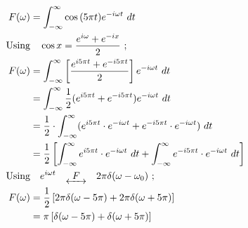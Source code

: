 \documentclass[preview]{standalone}
\begin{document}
\begin{align*}
F(\omega)&=\int_{-\infty}^{\infty} \cos{(5\pi t)} e^{-i\omega t} \ dt \\ \textrm{Using}& \quad \cos{x}=\frac{e^{i\omega}+e^{-ix}}{2} \ ; \\ F(\omega)&=\int_{-\infty}^{\infty}\left[ \frac{e^{i5\pi t}+e^{-i5\pi t}}{2}\right] e^{-i\omega t} \ dt \\ &=\int_{-\infty}^{\infty} \frac{1}{2} (e^{i5\pi t}+e^{-i5\pi t})e^{-i\omega t} \ dt \\ &=\frac{1}{2}\cdot \int_{-\infty}^{\infty}(e^{i5\pi t}\cdot e^{-i\omega t}+e^{-i5\pi t}\cdot e^{-i\omega t}) \ dt \\ &=\frac{1}{2}\left[ \int_{-\infty}^{\infty}e^{i5\pi t}\cdot e^{-i\omega t} \ dt+\int_{-\infty}^{\infty} e^{-i5\pi t}\cdot e^{-i\omega t} \ dt \right] \\ \textrm{Using}& \quad e^{i\omega t} \quad \underleftrightarrow{ \ \ F \ \ } \quad 2\pi \delta(\omega - \omega_{0}) \ ; \\ F(\omega)&=\frac{1}{2}\left[ 2\pi \delta(\omega-5\pi)+2\pi\delta(\omega+5\pi) \right] \\ &=\pi\left[\delta(\omega-5\pi)+\delta(\omega+5\pi)\right]
\end{align*}
\end{document}
